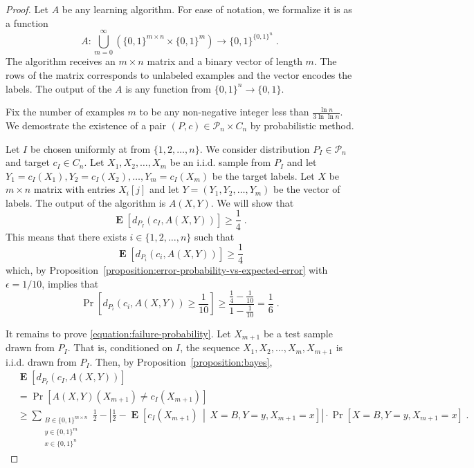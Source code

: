 \documentclass[10pt]{article}
\renewcommand{\P}{\mathcal{P}}
\DeclareMathOperator{\Exp}{\mathbf{E}}
\begin{document}
\begin{proof}
Let $A$ be any learning algorithm. For ease of notation, we formalize it is as a function
$$
A:\bigcup_{m=0}^\infty \left(\{0,1\}^{m \times n} \times \{0,1\}^m\right) \to \{0,1\}^{\{0,1\}^n} \; .
$$
The algorithm receives an $m \times n$ matrix and a binary vector of length $m$.
The rows of the matrix corresponds to unlabeled examples and the vector encodes
the labels. The output of the $A$ is any function from $\{0,1\}^n \to \{0,1\}$.

Fix the number of examples $m$ to be any non-negative integer less than
$\frac{\ln n}{3 \ln \ln n}$. We demostrate the existence of a pair $(P,c) \in
\P_n \times C_n$ by probabilistic method.

Let $I$ be chosen uniformly at from $\{1,2,\dots,n\}$. We consider distribution $P_I \in \P_n$ and target $c_I \in C_n$.
Let $X_1, X_2, \dots, X_m$ be an i.i.d. sample from $P_I$ and
let $Y_1 = c_I(X_1), Y_2 = c_I(X_2), \dots, Y_m = c_I(X_m)$ be the target
labels. Let $X$ be $m \times n$ matrix with entries $X_i[j]$ and let $Y = (Y_1,
Y_2, \dots, Y_m)$ be the vector of labels. The output of the algorithm is $A(X,Y)$.
We will show that
\begin{equation}
\label{equation:failure-probability}
\Exp \left[d_{P_I}(c_I, A(X,Y)) \right] \ge \frac{1}{4} \; .
\end{equation}
This means that there exists $i \in \{1,2,\dots,n\}$ such that
$$
\Exp \left[d_{P_i}(c_i, A(X,Y)) \right] \ge \frac{1}{4}
$$
which, by Proposition~\ref{proposition:error-probability-vs-expected-error} with $\epsilon=1/10$, implies that
$$
\Pr \left[ d_{P_i}(c_i, A(X,Y)) \ge \frac{1}{10} \right] \ge \frac{\frac{1}{4} - \frac{1}{10}}{1 - \frac{1}{10}} = \frac{1}{6} \; .
$$

It remains to prove \eqref{equation:failure-probability}.
Let $X_{m+1}$ be a test sample drawn from $P_I$. That is, conditioned on $I$, the sequence $X_1, X_2, \dots, X_m, X_{m+1}$ is i.i.d. drawn from $P_I$.
Then, by Proposition~\ref{proposition:bayes},
\begin{align*}
& \Exp \left[d_{P_I}(c_I, A(X,Y))\right] \\
& = \Pr\left[ A(X,Y)(X_{m+1}) \neq c_I(X_{m+1}) \right] \\
& \ge \sum_{\substack{B \in \{0,1\}^{m \times n} \\ y \in \{0,1\}^m \\ x \in \{0,1\}^n}} \frac{1}{2} - \left| \frac{1}{2} - \Exp\left[ c_I(X_{m+1}) \, \middle| \, X = B, Y = y, X_{m+1} = x \right] \right| \cdot \Pr \left[X = B, Y = y, X_{m+1} = x \right] \; .
\end{align*}


\end{proof}
\end{document}
